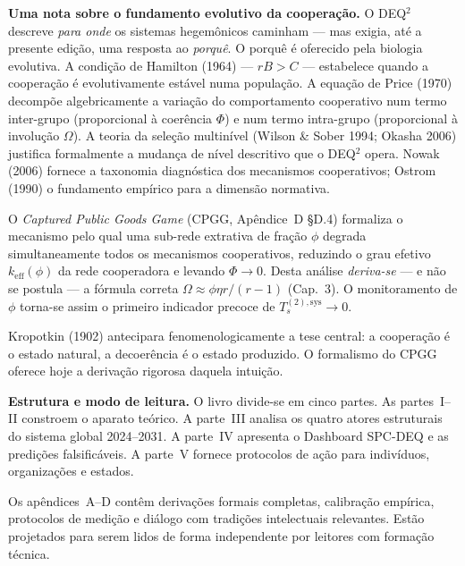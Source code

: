 \documentclass[12pt, twoside]{book}
\theoremstyle{plain}
\theoremstyle{definition}
\theoremstyle{remark}
\begin{document}
\textbf{Uma nota sobre o fundamento evolutivo da coopera\c{c}\~{a}o.}
O DEQ$^2$ descreve \textit{para onde} os sistemas hegem\^{o}nicos caminham --- mas exigia, at\'{e} a presente edi\c{c}\~{a}o, uma resposta ao \textit{porqu\^{e}}. O porqu\^{e} \'{e} oferecido pela biologia evolutiva. A condi\c{c}\~{a}o de Hamilton (1964) --- $rB > C$ --- estabelece quando a coopera\c{c}\~{a}o \'{e} evolutivamente est\'{a}vel numa popula\c{c}\~{a}o. A equa\c{c}\~{a}o de Price (1970) decompõe algebricamente a varia\c{c}\~{a}o do comportamento cooperativo num termo inter-grupo (proporcional à coer\^{e}ncia $\Phi$) e num termo intra-grupo (proporcional \`{a} involu\c{c}\~{a}o $\Omega$). A teoria da sele\c{c}\~{a}o multinível (Wilson \& Sober 1994; Okasha 2006) justifica formalmente a mudan\c{c}a de n\'{i}vel descritivo que o DEQ$^2$ opera. Nowak (2006) fornece a taxonomia diagn\'{o}stica dos mecanismos cooperativos; Ostrom (1990) o fundamento emp\'{i}rico para a dimens\~{a}o normativa.

O \textit{Captured Public Goods Game} (CPGG, Ap\^{e}ndice~D §D.4) formaliza o mecanismo pelo qual uma sub-rede extrativa de fra\c{c}\~{a}o $\phi$ degrada simultaneamente todos os mecanismos cooperativos, reduzindo o grau efetivo $k_\text{eff}(\phi)$ da rede cooperadora e levando $\Phi \to 0$. Desta an\'{a}lise \emph{deriva-se} --- e n\~{a}o se postula --- a f\'{o}rmula correta $\Omega \approx \phi\eta r/(r-1)$ (Cap.~3). O monitoramento de $\phi$ torna-se assim o primeiro indicador precoce de $T_s^{(2),\text{sys}} \to 0$.

Kropotkin (1902) antecipara fenomenologicamente a tese central: a coopera\c{c}\~{a}o \'{e} o estado natural, a decoer\^{e}ncia \'{e} o estado produzido. O formalismo do CPGG oferece hoje a deriva\c{c}\~{a}o rigorosa daquela intui\c{c}\~{a}o.

\textbf{Estrutura e modo de leitura.}
O livro divide-se em cinco partes. As partes~I--II constroem o aparato te\'{o}rico. A parte~III analisa os quatro atores estruturais do sistema global 2024--2031. A parte~IV apresenta o Dashboard SPC-DEQ e as predi\c{c}\~{o}es falsific\'{a}veis. A parte~V fornece protocolos de a\c{c}\~{a}o para indiv\'{i}duos, organiza\c{c}\~{o}es e estados.

Os ap\^{e}ndices~A--D cont\^{e}m deriva\c{c}\~{o}es formais completas, calibra\c{c}\~{a}o emp\'{i}rica, protocolos de medi\c{c}\~{a}o e di\'{a}logo com tradi\c{c}\~{o}es intelectuais relevantes. Est\~{a}o projetados para serem lidos de forma independente por leitores com forma\c{c}\~{a}o t\'{e}cnica.
\end{document}
